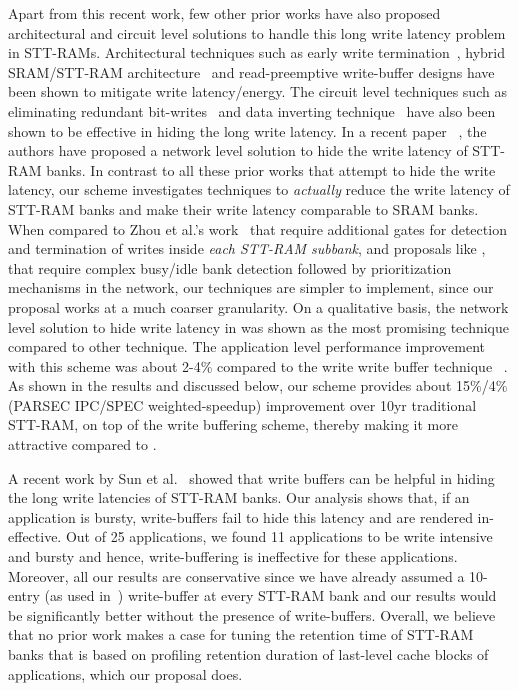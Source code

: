 Apart from this recent work, few other prior works have also proposed architectural and circuit level
solutions to handle this long write latency problem in STT-RAMs. Architectural techniques such as
early write termination~\cite{mram-energy-reduction}, hybrid SRAM/STT-RAM
architecture~\cite{gsun-hpca, Qureshi:2009:SHPMM} and read-preemptive write-buffer designs have been
shown to mitigate write latency/energy. The circuit level techniques such as eliminating redundant
bit-writes~\cite{mram-energy-reducton} and data inverting technique~\cite{gsun-hpca} have also been
shown to be effective in hiding the long write latency. In a recent paper ~\cite{mram-noc}, the authors have proposed a
network level solution to hide the write latency of STT-RAM banks.  In contrast to all these prior
works that attempt to hide the write latency, our scheme investigates techniques to {\it actually}
reduce the write latency of STT-RAM banks
and make their write latency comparable to SRAM banks. When compared to Zhou et al.'s
work~\cite{mram-energy-reduction} that require additional gates for detection and termination of
writes inside {\it each STT-RAM subbank}, and proposals like \cite{mram-noc}, that require complex
busy/idle bank detection followed by prioritization mechanisms in the network, our techniques are
simpler to implement, since our proposal works at a much coarser granularity.
On a qualitative basis, the network level solution to hide write latency in  \cite{mram-noc} was shown 
as the most promising technique compared to other technique. The application level performance improvement
with this scheme was about 2-4\% compared to the write write buffer technique ~\cite{gsun-hpca}.
As shown in the results and discussed below, our scheme provides about 15\%/4\%(PARSEC IPC/SPEC weighted-speedup) 
improvement over 10yr traditional STT-RAM, on top of the write buffering scheme, thereby making it more attractive compared to \cite{mram-noc}.

A recent work by Sun et al.~\cite{gsun-hpca} showed that write buffers can be helpful in hiding the
long write latencies of STT-RAM banks. Our analysis shows that, if an application is bursty,
write-buffers fail to hide this latency and are rendered in-effective. Out of 25 applications, we
found 11 applications to be write intensive and bursty and hence, write-buffering is ineffective for
these applications. Moreover, all our results are conservative since we have already assumed a
10-entry (as used in~\cite{gsun-hpca}) write-buffer at every STT-RAM bank and our results would be
significantly better without the presence of write-buffers. Overall, we believe that no prior work
makes a case for tuning the retention time of STT-RAM banks that is based on profiling retention
duration of last-level cache blocks of applications, which our proposal does.

